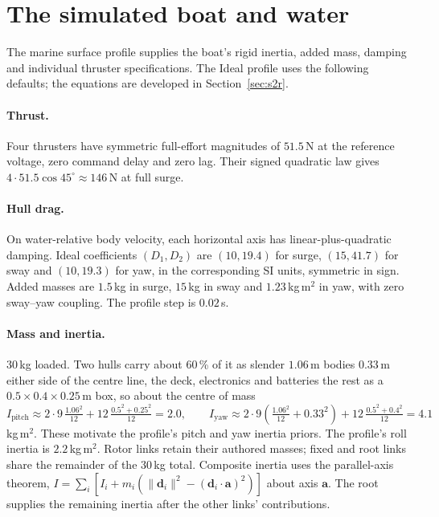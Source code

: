 \section{The simulated boat and water}
\label{sec:sim}

The marine surface profile supplies the boat's rigid inertia, added mass,
damping and individual thruster specifications. The Ideal profile uses the
following defaults; the equations are developed in Section~\ref{sec:s2r}.

\paragraph{Thrust.} Four thrusters have symmetric full-effort magnitudes of
$51.5$\,N at the reference voltage, zero command delay and zero lag. Their
signed quadratic law gives $4\cdot51.5\cos45^\circ\approx146$\,N at full surge.

\paragraph{Hull drag.} On water-relative body velocity, each horizontal axis
has linear-plus-quadratic damping. Ideal coefficients $(D_1,D_2)$ are
$(10,19.4)$ for surge, $(15,41.7)$ for sway and $(10,19.3)$ for yaw, in the
corresponding SI units, symmetric in sign. Added masses are $1.5$\,kg in surge,
$15$\,kg in sway and $1.23$\,kg\,m$^2$ in yaw, with zero sway--yaw coupling.
The profile step is $0.02$\,s.

\paragraph{Mass and inertia.} 30\,kg loaded. Two hulls carry about 60\,\% of
it as slender $1.06$\,m bodies $0.33$\,m either side of the centre line, the deck,
electronics and batteries the rest as a $0.5\times0.4\times0.25$\,m box, so about
the centre of mass
\[
  I_\text{pitch} \approx 2\cdot 9\,\tfrac{1.06^2}{12} + 12\,\tfrac{0.5^2+0.25^2}{12} = 2.0,\qquad
  I_\text{yaw} \approx 2\cdot 9\left(\tfrac{1.06^2}{12} + 0.33^2\right) + 12\,\tfrac{0.5^2+0.4^2}{12} = 4.1
\]
kg\,m$^2$. These motivate the profile's pitch and yaw inertia priors.
The profile's roll inertia is $2.2$\,kg\,m$^2$. Rotor links retain their authored
masses; fixed and root links share the remainder of the 30\,kg total. Composite
inertia uses the parallel-axis theorem,
$I=\sum_i[I_i+m_i(\|\bm d_i\|^2-(\bm d_i\cdot\bm a)^2)]$ about axis $\bm a$.
The root supplies the remaining inertia after the other links' contributions.

